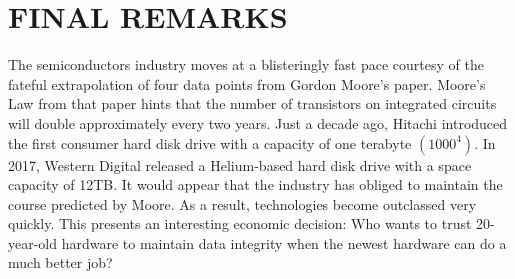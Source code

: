 \documentclass[letterpaper, 10 pt, conference]{ieeeconf}
\begin{document}
\section{FINAL REMARKS}
The semiconductors industry moves at a blisteringly fast pace courtesy of the fateful extrapolation of four data points from Gordon Moore's paper.  Moore’s Law from that paper hints that the number of transistors on integrated circuits will double approximately every two years.  Just a decade ago, Hitachi introduced the first consumer hard disk drive with a capacity of one terabyte $(1000^4)$.  In 2017, Western Digital released a Helium-based hard disk drive with a space capacity of 12TB.  It would appear that the industry has obliged to maintain the course predicted by Moore.  As a result, technologies become outclassed very quickly.  This presents an interesting economic decision: Who wants to trust 20-year-old hardware to maintain data integrity when the newest hardware can do a much better job?


\end{document}
